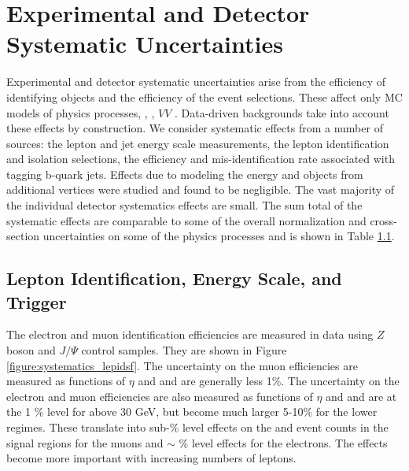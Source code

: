 \section{Experimental and Detector Systematic Uncertainties}

Experimental and detector systematic uncertainties arise from the efficiency of identifying objects and the efficiency of the event selections. These affect only MC models of physics processes, \ttV, \tth, $VV$ . Data-driven backgrounds take into account these effects by construction. We consider systematic effects from a number of sources: the lepton and jet energy scale measurements, the lepton identification and isolation selections, the efficiency and mis-identification rate associated with tagging b-quark jets. Effects due to modeling the energy and objects from additional vertices were studied and found to be negligible. The vast majority of the individual detector systematics effects are small. The sum total of the systematic effects are comparable to some of the overall normalization and cross-section uncertainties on some of the physics processes and is shown in Table \ref{}.

\subsection{Lepton Identification, Energy Scale, and Trigger}
The electron\cite{ATLAS-CONF-2014-032} and muon identification efficiencies\cite{MuonSF} are measured in data using $Z$ boson and $J/\Psi$ control samples. They are shown in Figure \ref{figure:systematics_lepidsf}. The uncertainty on the muon efficiencies are measured as functions of $\eta$ and \pt and are generally less 1\%. The uncertainty on the electron and muon efficiencies are also measured as functions of $\eta$ and \pt and are at the 1 \% level for \pt above 30 GeV, but become much larger 5-10\% for the lower \pt regimes.   These translate into sub-\% level effects on the \ttV and \tth event counts in the signal regions for the muons and $\sim$ \% level effects for the electrons. The effects become more important with increasing numbers of leptons.  

